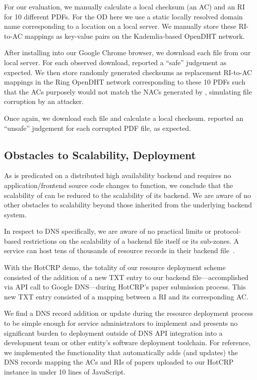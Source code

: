 For our evaluation, we manually calculate a local checksum (\ie an AC) and an RI
for 10 different \CONFERENCE{} PDFs. For the OD here we use a static locally
resolved domain name corresponding to a location on a local server. We manually
store these RI-to-AC mappings as key-value pairs on the Kademlia-based OpenDHT
network.

After installing \DHTSYS{} into our Google Chrome browser, we download each file
from our local server. For each observed download, \DHTSYS{} reported a ``safe''
judgement as expected. We then store randomly generated checksums as replacement
RI-to-AC mappings in the Ring OpenDHT network corresponding to these 10 PDFs
such that the ACs purposely would not match the NACs generated by \DHTSYS{},
simulating file corruption by an attacker.

Once again, we download each file and calculate a local checksum. \DHTSYS{}
reported an ``unsafe'' judgement for each corrupted PDF file, as expected.

\subsection{Obstacles to Scalability, Deployment}

As \SYSTEM{} is predicated on a distributed high availability backend and
requires no application/frontend source code changes to function, we conclude
that the scalability of \SYSTEM{} can be reduced to the scalability of its
backend. We are aware of no other obstacles to scalability beyond those
inherited from the underlying backend system.

In respect to DNS specifically, we are aware of no practical limits or
protocol-based restrictions on the scalability of a backend file itself or its
sub-zones. A service can host tens of thousands of resource records in their
backend file~\cite{DNS1, DNS2}.

With the HotCRP demo, the totality of our resource deployment scheme consisted
of the addition of a new TXT entry to our backend file---accomplished via API
call to Google DNS---during HotCRP's paper submission process. This new TXT
entry consisted of a mapping between a RI and its corresponding AC.

We find a DNS record addition or update during the resource deployment process
to be simple enough for service administrators to implement and presents no
significant burden to deployment outside of DNS API integration into a
development team or other entity's software deployment toolchain. For reference,
we implemented the functionality that automatically adds (and updates) the DNS
records mapping the ACs and RIs of papers uploaded to our HotCRP instance in
under 10 lines of JavaScript.

